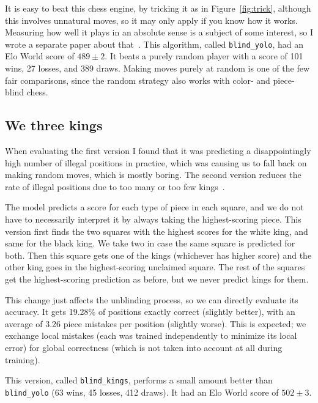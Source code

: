 \documentclass[twocolumn]{amsart}
\begin{document}
It is easy to beat this chess engine, by tricking it as in
Figure~\ref{fig:trick}, although this involves unnatural moves, so it
may only apply if you know how it works.
Measuring how well it plays in an absolute sense is a subject of some
interest, so I wrote a separate paper about that~\cite{eloworld}. This
algorithm, called \verb+blind_yolo+, had an Elo World score of $489 \pm 2$. It
beats a purely random player with a score of 101 wins, 27 losses, and
389 draws. Making moves purely at random is one of the few fair
comparisons, since the random strategy also works with color- and
piece-blind chess.

\subsection{We three kings} \label{sec:singleking}

When evaluating the first version I found that it was predicting a
disappointingly high number of illegal positions in practice, which
was causing us to fall back on making random moves, which is mostly
boring. The second version reduces the rate of illegal positions due
to too many or too few kings~\cite{kingme}.

The model predicts a score for each type of piece in each square, and
we do not have to necessarily interpret it by always taking the
highest-scoring piece. This version first finds the two squares with
the highest scores for the white king, and same for the black king. We
take two in case the same square is predicted for both. Then this
square gets one of the kings (whichever has higher score) and the
other king goes in the highest-scoring unclaimed square. The rest of
the squares get the highest-scoring prediction as before, but we never
predict kings for them.

This change just affects the unblinding process, so we can directly
evaluate its accuracy. It gets 19.28\% of positions exactly correct
(slightly better), with an average of 3.26 piece mistakes per position
(slightly worse). This is expected; we exchange local mistakes (each
was trained independently to minimize its local error) for global
correctness (which is not taken into account at all during training).

This version, called \verb+blind_kings+, performs a small amount better
than \verb+blind_yolo+ (63 wins, 45 losses, 412 draws).
It had an Elo World score of $502 \pm 3$.
\end{document}
